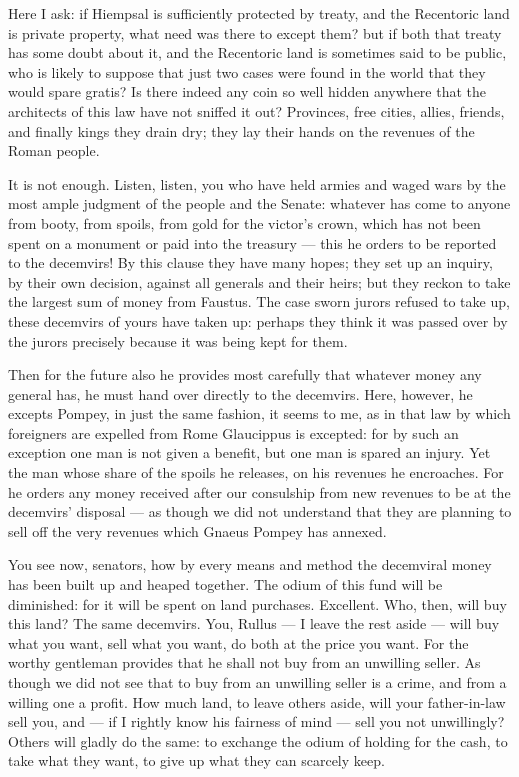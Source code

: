  Here I ask: if Hiempsal is sufficiently protected by treaty, and the Recentoric land is private property, what need was there to except them? but if both that treaty has some doubt about it, and the Recentoric land is sometimes said to be public, who is likely to suppose that just two cases were found in the world that they would spare gratis? Is there indeed any coin so well hidden anywhere that the architects of this law have not sniffed it out? Provinces, free cities, allies, friends, and finally kings they drain dry; they lay their hands on the revenues of the Roman people.

 It is not enough. Listen, listen, you who have held armies and waged wars by the most ample judgment of the people and the Senate: whatever has come to anyone from booty, from spoils, from gold for the victor's crown, which has not been spent on a monument or paid into the treasury --- this he orders to be reported to the decemvirs! By this clause they have many hopes; they set up an inquiry, by their own decision, against all generals and their heirs; but they reckon to take the largest sum of money from Faustus. The case sworn jurors refused to take up, these decemvirs of yours have taken up: perhaps they think it was passed over by the jurors precisely because it was being kept for them.

 Then for the future also he provides most carefully that whatever money any general has, he must hand over directly to the decemvirs. Here, however, he excepts Pompey, in just the same fashion, it seems to me, as in that law by which foreigners are expelled from Rome Glaucippus is excepted: for by such an exception one man is not given a benefit, but one man is spared an injury. Yet the man whose share of the spoils he releases, on his revenues he encroaches. For he orders any money received after our consulship from new revenues to be at the decemvirs' disposal --- as though we did not understand that they are planning to sell off the very revenues which Gnaeus Pompey has annexed.

 You see now, senators, how by every means and method the decemviral money has been built up and heaped together. The odium of this fund will be diminished: for it will be spent on land purchases. Excellent. Who, then, will buy this land? The same decemvirs. You, Rullus --- I leave the rest aside --- will buy what you want, sell what you want, do both at the price you want. For the worthy gentleman provides that he shall not buy from an unwilling seller. As though we did not see that to buy from an unwilling seller is a crime, and from a willing one a profit. How much land, to leave others aside, will your father-in-law sell you, and --- if I rightly know his fairness of mind --- sell you not unwillingly? Others will gladly do the same: to exchange the odium of holding for the cash, to take what they want, to give up what they can scarcely keep.

